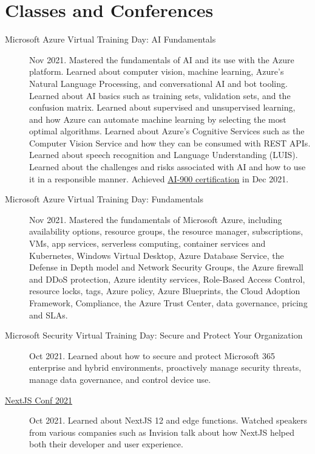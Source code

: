 \documentclass{article}
\begin{document}
\section*{Classes and Conferences}\vspace{-0.5em}
\begin{description}
  \item [Microsoft Azure Virtual Training Day: AI Fundamentals] Nov 2021. Mastered the fundamentals of AI and its use with the Azure platform. Learned about computer vision, machine learning, Azure's Natural Language Processing, and conversational AI and bot tooling. Learned about AI basics such as training sets, validation sets, and the confusion matrix. Learned about supervised and unsupervised learning, and how Azure can automate machine learning by selecting the most optimal algorithms. Learned about Azure's Cognitive Services such as the Computer Vision Service and how they can be consumed with REST APIs. Learned about speech recognition and Language Understanding (LUIS). Learned about the challenges and risks associated with AI and how to use it in a responsible manner. Achieved \href{https://www.credly.com/badges/fa66cf6b-dff5-4f58-9f4e-4b94fc91b7fa/public_url}{AI-900 certification} in Dec 2021.
  \item [Microsoft Azure Virtual Training Day: Fundamentals] Nov 2021. Mastered the fundamentals of Microsoft Azure, including availability options, resource groups, the resource manager, subscriptions, VMs, app services, serverless computing, container services and Kubernetes, Windows Virtual Desktop, Azure Database Service, the Defense in Depth model and Network Security Groups, the Azure firewall and DDoS protection, Azure identity services, Role-Based Access Control, resource locks, tags, Azure policy, Azure Blueprints, the Cloud Adoption Framework, Compliance, the Azure Trust Center, data governance, pricing and SLAs.
  \item [Microsoft Security Virtual Training Day: Secure and Protect Your Organization] Oct 2021. Learned about how to secure and protect Microsoft 365 enterprise and hybrid environments, proactively manage security threats, manage data governance, and control device use.
  \item [\href{https://www.linkedin.com/posts/alexander-koik-cestone-89304556_alexander-koik-cestones-nextjs-conf-ticket-activity-6855242508260184065-xJP9/}{NextJS Conf 2021}] Oct 2021. Learned about NextJS 12 and edge functions. Watched speakers from various companies such as Invision talk about how NextJS helped both their developer and user experience.

\end{description}
\end{document}

